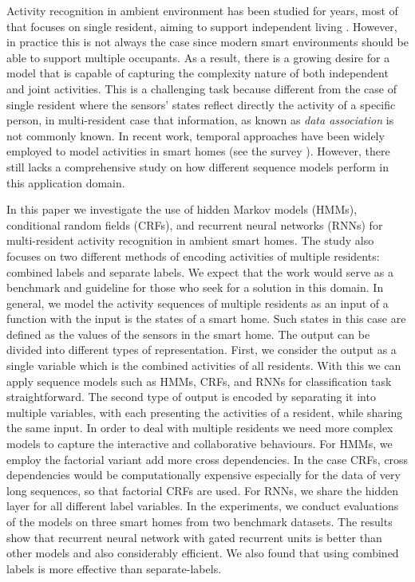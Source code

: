 Activity recognition in ambient environment has been studied for
years, most of that focuses on single resident, aiming to support
independent living \cite{vanKasteren_2008}.  However, in practice this
is not always the case since modern smart environments should be able
to support multiple occupants. As a result, there is a growing desire
for a model that is capable of capturing the complexity nature of both
independent and joint activities. This is a challenging task because
different from the case of single resident where the sensors' states
reflect directly the activity of a specific person, in multi-resident
case that information, as known as {\it data association} is
not commonly known. In recent work, temporal approaches have been
widely employed to model activities in smart homes (see the survey
\cite{Benmansour_2015}). However,
there still lacks a comprehensive study on how different sequence
models perform in this application domain.

In this paper we investigate the use of hidden Markov models (HMMs),
conditional random fields (CRFs), and recurrent neural networks (RNNs)
for multi-resident activity recognition in ambient smart homes. The
study also focuses on two different methods of encoding activities of
multiple residents: combined labels and separate labels.  We expect
that the work would serve as a benchmark and guideline for those who
seek for a solution in this domain. In general, we model the activity
sequences of multiple residents as an input of a function with the
input is the states of a smart home. Such states in this case are
defined as the values of the sensors in the smart home. The output can
be divided into different types of representation. First, we consider
the output as a single variable which is the combined activities of
all residents. With this we can apply sequence models such as HMMs,
CRFs, and RNNs for classification task straightforward. The second
type of output is encoded by separating it into multiple variables,
with each presenting the activities of a resident, while sharing the
same input. In order to deal with multiple residents we need more
complex models to capture the interactive and collaborative
behaviours. For HMMs, we employ the factorial variant
\cite{Ghahramani_1997} add more cross dependencies. In the case CRFs,
cross dependencies would be computationally expensive especially for
the data of very long sequences, so that factorial CRFs
\cite{Sutton_2007} are used. For RNNs, we share the hidden layer for
all different label variables. In the experiments, we conduct
evaluations of the models on three smart homes from two benchmark
datasets. The results show that recurrent neural network with gated
recurrent units is better than other models and also considerably
efficient. We also found that using combined labels is more effective
than separate-labels.

